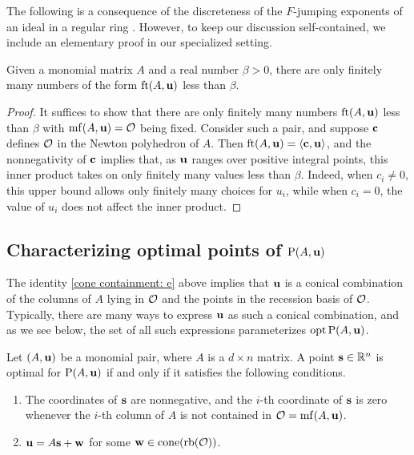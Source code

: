 \documentclass[11pt]{amsart}
\begin{document}
The following is a consequence of the discreteness of the $F$-jumping exponents of an ideal in a regular ring \cite[Theorem~3.1]{blickle+mustata+smith.discr_rat_FPTs}.
However, to keep our discussion self-contained, we include an elementary proof in our specialized setting.

\begin{proposition}
\label{discreteness: L}
Given a monomial matrix $A$ and a real number $\beta > 0 $, there are only finitely many numbers of the form $\operatorname{ft}(A, \mathbf{u})$ less than $\beta$.
\end{proposition}

\begin{proof}
   It suffices to show that there are only finitely many numbers $\operatorname{ft}(A, \mathbf{u})$ less than $\beta$ with $\operatorname{mf}(A, \mathbf{u}) = \mathcal{O}$ being fixed.
   Consider such a pair, and suppose $\mathbf{c}$ defines $\mathcal{O}$ in the Newton polyhedron of $A$.
   Then $\operatorname{ft}(A, \mathbf{u}) = \langle \mathbf{c}, \mathbf{u} \rangle$, and the nonnegativity of $\mathbf{c}$ implies that, as $\mathbf{u}$ ranges over positive integral points, this inner product takes on only finitely many values less than $\beta$.
   Indeed, when $c_i \ne 0$, this upper bound allows only finitely many choices for $u_i$, while when $c_i = 0$, the value of $u_i$ does not affect the inner product.
\end{proof}

\subsection{Characterizing optimal points of $\mathrm{P}(A,\mathbf{u})$}

The identity \eqref{cone containment: e} above implies that
$\mathbf{u}$ is a conical combination of the columns of $A$ lying in $\mathcal{O}$ and the points in the recession basis of $\mathcal{O}$.
Typically, there are many ways to express $\mathbf{u}$ as such a conical combination, and as we see below, the set of all such expressions parameterizes  $\operatorname{opt} \mathrm{P}(A, \mathbf{u})$.

\begin{proposition}\label{opt set: P}
   Let $(A,\mathbf{u})$ be a monomial pair, where $A$ is a $d\times n$ matrix.
   A point $\mathbf{s} \in \mathbb{R}^n$ is optimal for $\mathrm{P}(A, \mathbf{u})$ if and only if it satisfies the following conditions.
\begin{enumerate}
\item  \label{mc coords: e} The coordinates of $\mathbf{s}$ are nonnegative, and the $i$-th coordinate of $\mathbf{s}$ is zero whenever the $i$-th column of $A$ is not contained in $\mathcal{O} = \operatorname{mf}(A, \mathbf{u})$.
\item  \label{mc decomposition: e} $\mathbf{u} = A \mathbf{s} + \mathbf{w}$ for some $\mathbf{w} \in  \operatorname{cone}(\operatorname{rb}(\mathcal{O}))$.
\end{enumerate}
\end{proposition}
\end{document}
